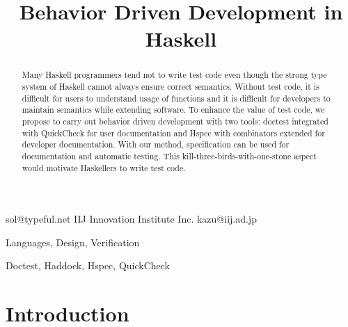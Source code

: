 \documentclass[preprint]{sigplanconf}
\begin{document}
\copyrightdata{[to be supplied]}


\title{Behavior Driven Development in Haskell}

           {}
           {sol@typeful.net}
           {IIJ Innovation Institute Inc.}
           {kazu@iij.ad.jp}

\maketitle

\begin{abstract}

Many Haskell programmers tend not to write test code even though the
strong type system of Haskell cannot always ensure correct semantics.
Without test code, it is difficult for users to understand usage of
functions and it is difficult for developers to maintain semantics
while extending software. To enhance the value of test code, we
propose to carry out behavior driven development with two tools:
doctest integrated with QuickCheck for user documentation and Hspec
with combinators extended for developer documentation. With our
method, specification can be used for documentation and automatic
testing. This kill-three-birds-with-one-stone aspect would motivate
Haskellers to write test code.


\end{abstract}


\terms Languages, Design, Verification

\keywords Doctest, Haddock, Hspec, QuickCheck

\section{Introduction}

\end{document}
